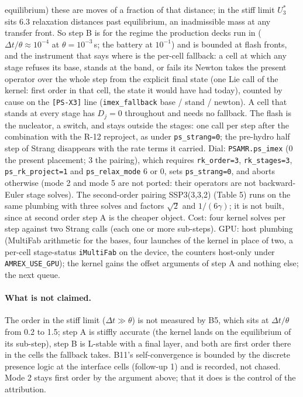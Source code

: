 \documentclass[11pt,a4paper]{article}
\newcommand{\code}[1]{\texttt{\small #1}}
\newcommand{\Dt}{\Delta t}
\begin{document}
equilibrium) these are moves of a fraction of that distance; in the
stiff limit $U_3^{*}$ sits 6.3 relaxation distances past equilibrium,
an inadmissible mass at any transfer front.  So step B is for the
regime the production decks run in ($\Dt/\theta \approx 10^{-4}$ at
$\theta = 10^{-3}$\,s; the battery at $10^{-1}$) and is bounded at
flash fronts, and the instrument that says where is the per-cell
fallback: a cell at which any stage refuses its base, stands at the
band, or fails its Newton takes the present operator over the whole
step from the explicit final state (one Lie call of the kernel: first
order in that cell, the state it would have had today), counted by
cause on the \code{[PS-X3]} line (\code{imex\_fallback} base / stand /
newton).  A cell that stands at every stage has $D_j = 0$ throughout
and needs no fallback.  The flash is the nucleator, a switch, and stays
outside the stages: one call per step after the combination with the
R-12 reproject, as under \code{ps\_strang=0}; the pre-hydro half step
of Strang disappears with the rate terms it carried.  Dial:
\code{PSAMR.ps\_imex} (0 the present placement; 3 the pairing), which
requires \code{rk\_order=3}, \code{rk\_stages=3}, \code{ps\_rk\_project=1}
and \code{ps\_relax\_mode} 6 or 0, sets \code{ps\_strang=0}, and aborts
otherwise (mode 2 and mode 5 are not ported: their operators are not
backward-Euler stage solves).  The second-order pairing SSP3(3,3,2)
(Table 5) runs on the same plumbing with three solves and factors
$\sqrt2$ and $1/(6\gamma)$; it is not built, since at second order step A
is the cheaper object.  Cost: four kernel solves per step against two
Strang calls (each one or more sub-steps).  GPU: host plumbing (MultiFab
arithmetic for the bases, four launches of the kernel in place of two,
a per-cell stage-status \code{iMultiFab} on the device, the counters
host-only under \code{AMREX\_USE\_GPU}); the kernel gains the offset
arguments of step A and nothing else; the next queue.

\paragraph{What is not claimed.}  The order in the stiff limit
($\Dt \gg \theta$) is not measured by B5, which sits at $\Dt/\theta$
from 0.2 to 1.5; step A is stiffly accurate (the kernel lands on the
equilibrium of its sub-step), step B is L-stable with a final layer,
and both are first order there in the cells the fallback takes.  B11's
self-convergence is bounded by the discrete presence logic at the
interface cells (follow-up 1) and is recorded, not chased.  Mode 2 stays
first order by the argument above; that it does is the control of the
attribution.
\end{document}
